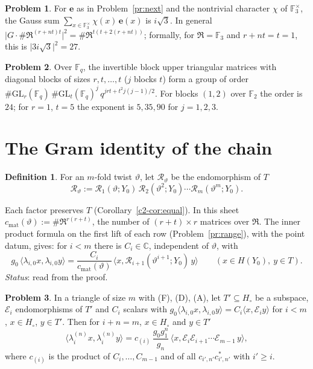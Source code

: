\documentclass[reqno]{amsart}
\theoremstyle{definition}
\newtheorem{problem}{Problem}[section]
\newtheorem{definition}{Definition}[section]
\theoremstyle{plain}
\newcommand{\C}{\mathbb C}
\newcommand{\F}{\mathbb F}
\newcommand{\Rc}{\mathcal R}
\newcommand{\GL}{\mathrm{GL}}
\newcommand{\cmat}{c_{\mathrm{mat}}}
\newcommand{\Hc}{H_\circ}
\begin{document}
\begin{problem}\label{pr:gauss}
For \(\mathbf e\) as in Problem~\ref{pr:next} and the nontrivial character \(\chi\) of \(\F_3^\times\), the Gauss sum \(\sum_{x \in \F_3^\times}\chi(x)\,\mathbf e(x)\) is \(i\sqrt3\).  In general \(\lvert G\cdot\#\mathfrak R^{(r+nt)t}\rvert^2 = \#\mathfrak R^{t(t + 2(r+nt))}\); formally, for \(\mathfrak R = \F_3\) and \(r + nt = t = 1\), this is \(\lvert 3i\sqrt3\rvert^2 = 27\).
\end{problem}

\begin{problem}\label{pr:flag}
Over \(\F_q\), the invertible block upper triangular matrices with diagonal blocks of sizes \(r, t, \dots, t\) (\(j\) blocks \(t\)) form a group of order \(\#\GL_r(\F_q)\,\#\GL_t(\F_q)^j\,q^{jrt + t^2 j(j-1)/2}\).  For blocks \((1,2)\) over \(\F_2\) the order is \(24\); for \(r = 1\), \(t = 5\) the exponent is \(5, 35, 90\) for \(j = 1, 2, 3\).
\end{problem}

\section{The Gram identity of the chain}\label{sec:gram}

\begin{definition}\label{def:rallis-product}
For an \(m\)-fold twist \(\vartheta\), let \(\Rc_\vartheta\) be the endomorphism of \(T\)
\[
  \Rc_\vartheta := \Rc_1(\vartheta; Y_0)\,\Rc_2(\vartheta^2; Y_0) \cdots \Rc_m(\vartheta^m; Y_0) .
\]
\end{definition}

Each factor preserves \(T\) (Corollary~\ref{c2-cor:equal}).  In this sheet \(\cmat(\vartheta) := \#\mathfrak R^{r(r+t)}\), the number of \((r+t) \times r\) matrices over \(\mathfrak R\).  The inner product formula on the first lift of each row (Problem~\ref{pr:range}), with the point datum, gives: for \(i < m\) there is \(C_i \in \C\), independent of \(\vartheta\), with
\[
  g_0\,\langle \lambda_{i,0}x, \lambda_{i,0}y\rangle = \frac{C_i}{\cmat(\vartheta)}\,\langle x, \Rc_{i+1}(\vartheta^{i+1}; Y_0)\,y\rangle \qquad (x \in H(Y_0),\ y \in T).
\]
\emph{Status}: read from the proof.

\begin{problem}\label{pr:full-row}
In a triangle of size \(m\) with (F), (D), (A), let \(T' \subseteq \Hc\) be a subspace, \(\mathcal E_i\) endomorphisms of \(T'\) and \(C_i\) scalars with \(g_0\langle \lambda_{i,0}x, \lambda_{i,0}y\rangle = C_i\langle x, \mathcal E_i y\rangle\) for \(i < m\), \(x \in \Hc\), \(y \in T'\).  Then for \(i + n = m\), \(x \in \Hc\) and \(y \in T'\)
\[
  \langle \lambda_i^{(n)}x, \lambda_i^{(n)}y\rangle = c_{(i)}\,\frac{g_0g_1^n}{g_n}\,\langle x, \mathcal E_i\mathcal E_{i+1}\cdots\mathcal E_{m-1}\,y\rangle ,
\]
where \(c_{(i)}\) is the product of \(C_i, \dots, C_{m-1}\) and of all \(c_{i',n'}c^*_{i',n'}\) with \(i' \ge i\).
\end{problem}
\end{document}

